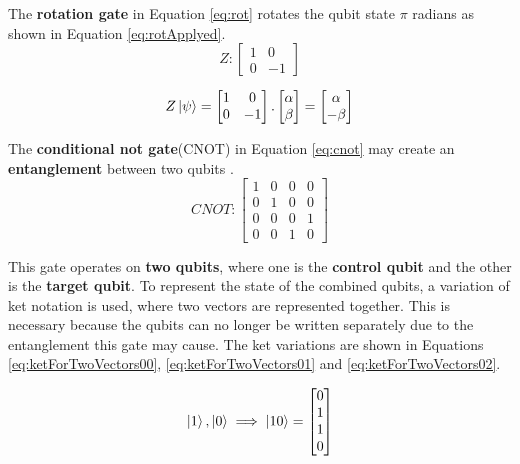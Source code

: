 			\par The \textbf{rotation gate} in Equation \ref{eq:rot} rotates the qubit state $\pi$ radians as shown in Equation \ref{eq:rotApplyed}.
			\begin{equation}
				\label{eq:rot}
				Z : 
				\begin{bmatrix}
					1& 0 \\
					0& -1
				\end{bmatrix}
			\end{equation}
			
			\begin{equation}
				\label{eq:rotApplyed}
				Z\ket{\psi} = \begin{bmatrix}
					1& 0 \\
					0& -1
				\end{bmatrix} . \begin{bmatrix}
					\alpha \\
					\beta
				\end{bmatrix} = \begin{bmatrix}
					\alpha \\
					-\beta
				\end{bmatrix}
			\end{equation}

			\par The \textbf{conditional not gate}(CNOT) in Equation \ref{eq:cnot} may create an \textbf{entanglement} between two qubits \cite{nielsen2002quantum}.
			\begin{equation}
				\label{eq:cnot}
				CNOT : 
				\begin{bmatrix}
					1& 0& 0& 0 \\
					0& 1& 0& 0 \\
					0& 0& 0& 1 \\
					0& 0& 1& 0
				\end{bmatrix}
			\end{equation}
		
			\par This gate operates on \textbf{two qubits}, where one is the \textbf{control qubit} and the other is the \textbf{target qubit}. To represent the state of the combined qubits, a variation of ket notation is used, where two vectors are represented together. This is necessary because the qubits can no longer be written separately due to the entanglement this gate may cause. The ket variations are shown in Equations \ref{eq:ketForTwoVectors00}, \ref{eq:ketForTwoVectors01} and \ref{eq:ketForTwoVectors02}.
			
			\begin{equation}
				\label{eq:ketForTwoVectors00}
				\ket{1}, \ket{0} \implies
				\ket{10} = \begin{bmatrix}
					0 \\
					1 \\
					1 \\
					0
				\end{bmatrix}				
			\end{equation}
		
